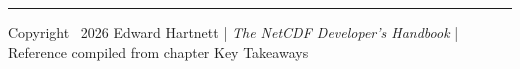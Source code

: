 \documentclass[8pt,letterpaper]{article}
\begin{document}
\vspace{1pt}\hrule\vspace{1pt}
{\tiny\centering Copyright \textcopyright\ 2026 Edward Hartnett \quad|\quad
\textit{The NetCDF Developer's Handbook} \quad|\quad
Reference compiled from chapter Key Takeaways\par}
\end{document}
